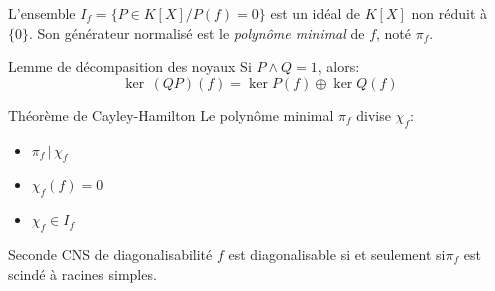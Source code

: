 \documentclass[french, a4paper, 11pt, twocolumn]{article}
\newcommand{\ssi}{si et seulement si\xspace}		%
\newcommand{\co}{\left[}         %
\newcommand{\cf}{\right]}        %
\newcommand{\cof}[1]{\co #1 \cf} %
\begin{document}
\begin{definition}
  L'ensemble \(I_{f}=\lbrace P\in K\cof{X} \slash P(f)=0\rbrace\) est un idéal de \(K\cof{X}\) non réduit à \(\lbrace 0 \rbrace\). Son générateur normalisé est le \emph{polynôme minimal} de \(f\), noté \(\pi_{f}\).
\end{definition}

\begin{theoreme}{Lemme de décompasition des noyaux}
  Si \(P\wedge Q = 1\), alors:
  \[\ker\, (QP)(f) = \ker P(f)\oplus \ker Q(f)\]
\end{theoreme}

\begin{theoreme}{Théorème de Cayley-Hamilton}
  Le polynôme minimal \(\pi_{f}\) divise \(\chi_{f}\):
  \begin{itemize}[label=\(\bullet\)]
    \item \(\pi_{f}\,|\,\chi_{f}\)
    \item \(\chi_{f}(f) = 0\)
    \item \(\chi_{f} \in I_{f}\)
  \end{itemize}
\end{theoreme}

\begin{theoreme}{Seconde CNS de diagonalisabilité}
  \(f\) est diagonalisable \ssi \(\pi_{f}\) est scindé à racines simples.
\end{theoreme}
\end{document}
